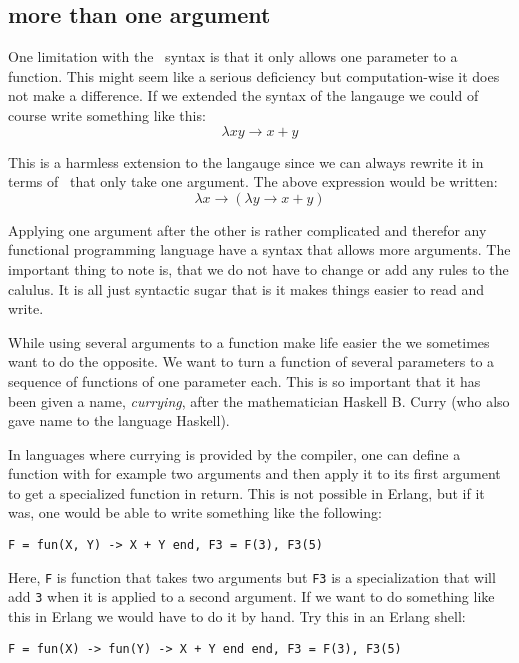 \documentclass[a4paper,11pt]{article}
\begin{document}
\subsection{more than one argument}

One limitation with the \lamc\ syntax is that it only allows one
parameter to a function. This might seem like a serious deficiency but
computation-wise it does not make a difference. If we extended the
syntax of the langauge we could of course write something like this:
$$\lambda x y \rightarrow x + y$$

This is a harmless extension to the langauge since we can always
rewrite it in terms of \lama\ that only take one argument. The above
expression would be written:
$$\lambda x \rightarrow (\lambda y \rightarrow x + y )$$

Applying one argument after the other is rather complicated and
therefor any functional programming language have a syntax that allows more arguments. The
important thing to note is, that we do not have to change or add any
rules to the calulus. It is all just syntactic sugar that is it makes
things easier to read and write.

While using several arguments to a function make life easier the
we sometimes want to do the opposite. We want to
turn a function of several parameters to a sequence of functions of
one parameter each. This is so important that it has been given a
name, {\em currying}, after the mathematician Haskell B. Curry (who also
gave name to the language Haskell).

In languages where currying is provided by the compiler, one can define
a function with for example two arguments and then apply it to its
first argument to get a specialized function in return. This is not
possible in Erlang, but if it was, one would be able to write something
like the following:

\vspace{10pt}
\begin{center}{\tt F = fun(X, Y) ->  X  + Y end, F3 = F(3), F3(5)}
\end{center}
\vspace{10pt}

Here, {\tt F} is function that takes two arguments but {\tt F3} is a
specialization that will add {\tt 3} when it is applied to a second
argument. If we want to do something like this in Erlang we would have
to do it by hand. Try this in an Erlang shell:

\vspace{10pt}
\begin{center}{\tt F = fun(X) -> fun(Y) ->  X  + Y end end, F3 = F(3), F3(5)}
\end{center}
\vspace{10pt}
\end{document}
